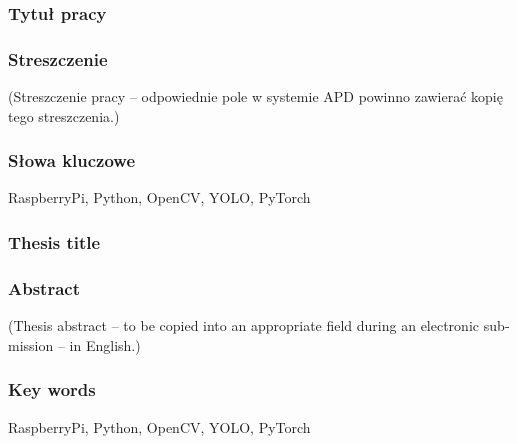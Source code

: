 \documentclass[a4paper,twoside,12pt]{book}
\begin{document}


\cleardoublepage

\rmfamily\normalfont
\pagestyle{empty}



\subsubsection*{Tytuł pracy} 
\Title

\subsubsection*{Streszczenie}  
(Streszczenie pracy – odpowiednie pole w systemie APD powinno zawierać kopię tego streszczenia.)

\subsubsection*{Słowa kluczowe} 
RaspberryPi, Python, OpenCV, YOLO, PyTorch

\subsubsection*{Thesis title} 
\begin{otherlanguage}{british}
\TitleAlt
\end{otherlanguage}

\subsubsection*{Abstract} 
\begin{otherlanguage}{british}
(Thesis abstract – to be copied into an appropriate field during an electronic submission – in English.)
\end{otherlanguage}
\subsubsection*{Key words}  
\begin{otherlanguage}{british}
RaspberryPi, Python, OpenCV, YOLO, PyTorch
\end{otherlanguage}
\end{document}
